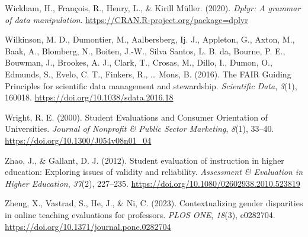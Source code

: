 \documentclass[
  man]{apa7}
\newlength{\cslhangindent}
\newlength{\cslentryspacingunit} %
\newenvironment{CSLReferences}[2] %
 {%
  \setlength{\parindent}{0pt}
  \ifodd #1
  \let\oldpar\par
  \def\par{\hangindent=\cslhangindent\oldpar}
  \fi
  \setlength{\parskip}{#2\cslentryspacingunit}
 }%
 {}
\begin{document}
\begin{CSLReferences}{1}{0}
\leavevmode{}%
Wickham, H., François, R., Henry, L., \& Kirill Müller. (2020). \emph{Dplyr: A grammar of data manipulation}. \url{https://CRAN.R-project.org/package=dplyr}

\leavevmode{}%
Wilkinson, M. D., Dumontier, M., Aalbersberg, Ij. J., Appleton, G., Axton, M., Baak, A., Blomberg, N., Boiten, J.-W., Silva Santos, L. B. da, Bourne, P. E., Bouwman, J., Brookes, A. J., Clark, T., Crosas, M., Dillo, I., Dumon, O., Edmunds, S., Evelo, C. T., Finkers, R., \ldots{} Mons, B. (2016). The FAIR Guiding Principles for scientific data management and stewardship. \emph{Scientific Data}, \emph{3}(1), 160018. \url{https://doi.org/10.1038/sdata.2016.18}

\leavevmode{}%
Wright, R. E. (2000). Student Evaluations and Consumer Orientation of Universities. \emph{Journal of Nonprofit \& Public Sector Marketing}, \emph{8}(1), 33--40. \url{https://doi.org/10.1300/J054v08n01_04}

\leavevmode{}%
Zhao, J., \& Gallant, D. J. (2012). Student evaluation of instruction in higher education: Exploring issues of validity and reliability. \emph{Assessment \& Evaluation in Higher Education}, \emph{37}(2), 227--235. \url{https://doi.org/10.1080/02602938.2010.523819}

\leavevmode{}%
Zheng, X., Vastrad, S., He, J., \& Ni, C. (2023). Contextualizing gender disparities in online teaching evaluations for professors. \emph{PLOS ONE}, \emph{18}(3), e0282704. \url{https://doi.org/10.1371/journal.pone.0282704}

\end{CSLReferences}
\end{document}
